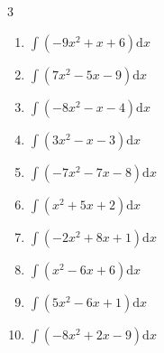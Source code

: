\begin{multicols}{3}
\begin{enumerate}
\columnbreak %

  \item $\displaystyle \int \left( -9x^{2}+x+6 \right) \mathrm{d}x$


  \item $\displaystyle \int \left( 7x^{2}-5x-9 \right) \mathrm{d}x$


  \item $\displaystyle \int \left( -8x^{2}-x-4 \right) \mathrm{d}x$


  \item $\displaystyle \int \left( 3x^{2}-x-3 \right) \mathrm{d}x$


  \item $\displaystyle \int \left( -7x^{2}-7x-8 \right) \mathrm{d}x$


  \item $\displaystyle \int \left( x^{2}+5x+2 \right) \mathrm{d}x$


  \item $\displaystyle \int \left( -2x^{2}+8x+1 \right) \mathrm{d}x$


  \item $\displaystyle \int \left( x^{2}-6x+6 \right) \mathrm{d}x$


  \item $\displaystyle \int \left( 5x^{2}-6x+1 \right) \mathrm{d}x$


  \item $\displaystyle \int \left( -8x^{2}+2x-9 \right) \mathrm{d}x$



\end{enumerate}
\end{multicols}

